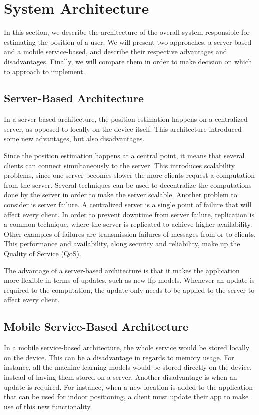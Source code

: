 \section{System Architecture}
In this section, we describe the architecture of the overall system responsible for estimating the position of a user. We will present two approaches, a server-based and a mobile service-based, and describe their respective advantages and disadvantages. Finally, we will compare them in order to make decision on which to approach to implement.

\subsection{Server-Based Architecture}
In a server-based architecture, the position estimation happens on a centralized server, as opposed to locally on the device itself. This architecture introduced some new advantages, but also disadvantages.

Since the position estimation happens at a central point, it means that several clients can connect simultaneously to the server. This introduces scalability problems, since one server becomes slower the more clients request a computation from the server. Several techniques can be used to decentralize the computations done by the server in order to make the server scalable. Another problem to consider is server failure. A centralized server is a single point of failure that will affect every client. In order to prevent downtime from server failure, replication is a common technique, where the server is replicated to achieve higher availability. Other examples of failures are transmission failures of messages from or to clients.
This performance and availability, along security and reliability, make up the Quality of Service (QoS).\cite{DS}

The advantage of a server-based architecture is that it makes the application more flexible in terms of updates, such as new \gls{lfp} models. Whenever an update is required to the computation, the update only needs to be applied to the server to affect every client.

\subsection{Mobile Service-Based Architecture}
In a mobile service-based architecture, the whole service would be stored locally on the device. This can be a disadvantage in regards to memory usage. For instance, all the machine learning models would be stored directly on the device, instead of having them stored on a server. Another disadvantage is when an update is required. For instance, when a new location is added to the application that can be used for indoor positioning, a client must update their app to make use of this new functionality.

